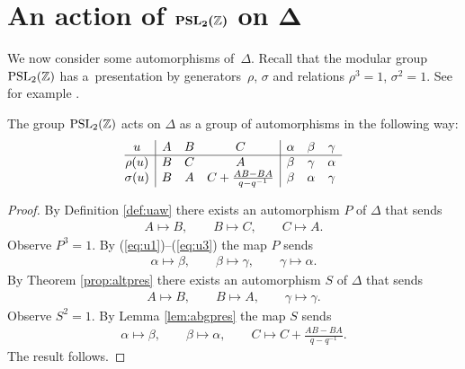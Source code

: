 \section[An action of ${\rm  {PSL}}_2(\mathbb Z)$ on $\Delta$]{An action of $\boldsymbol{{\rm  {PSL}}_2(\mathbb Z)}$ on $\boldsymbol{\Delta}$}

We now consider
some automorphisms of~$\Delta $.
Recall that the modular group
${\rm  {PSL}}_2(\mathbb Z)$ has a~presentation
by generators~$\rho$, $\sigma$ and
relations $\rho^3=1$, $\sigma^2=1$.
See for example \cite{alpern}.


\begin{Theorem}
\label{thm:try}
The group
${\rm  {PSL}}_2(\mathbb Z)$ acts on
$\Delta $ as a group of automorphisms in the following way:
\[
\begin{array}{@{}c| ccc | c c c}
u &  A & B  & C
&  \alpha & \beta  & \gamma
\\
\hline
\rho(u) &  B & C & A
&  \beta  & \gamma & \alpha
\\
\sigma(u) &  B & A & C+\frac{AB-BA}{q-q^{-1}}
&  \beta & \alpha & \gamma
\end{array}
\]
\end{Theorem}

\begin{proof}
By Def\/inition
\ref{def:uaw} there exists an automorphism
$P$ of $\Delta $ that sends
\begin{gather*}
A \mapsto B,
\qquad
B \mapsto C,
\qquad
C \mapsto A.
\end{gather*}
Observe $P^3=1$. By
(\ref{eq:u1})--(\ref{eq:u3})
the map $P$ sends
\begin{gather*}
\alpha \mapsto \beta,
\qquad
\beta \mapsto \gamma,
\qquad
\gamma \mapsto \alpha.
\end{gather*}
By Theorem
\ref{prop:altpres} there exists
an automorphism
$S$ of $\Delta $ that sends
\begin{gather*}
A \mapsto B,
 \qquad
B \mapsto A,
\qquad
\gamma \mapsto \gamma.
\end{gather*}
Observe $S^2=1$. By
Lemma
\ref{lem:abgpres}
the map $S$
sends
\begin{gather*}
\alpha \mapsto \beta,
\qquad
\beta \mapsto \alpha,
\qquad
C \mapsto C + \frac{AB-BA}{q-q^{-1}}.
\end{gather*}
The result follows.
\end{proof}
